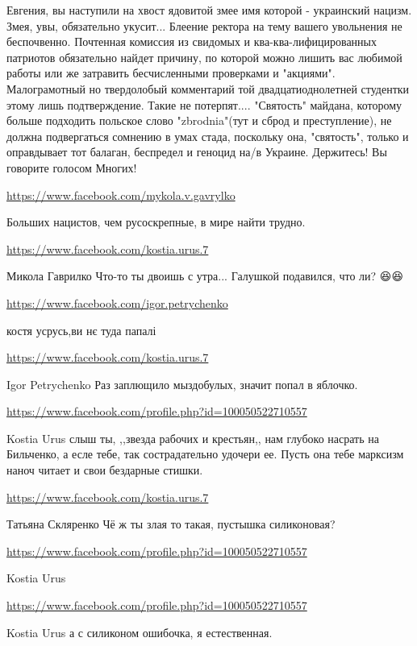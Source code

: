 \documentclass[a4paper,11pt]{extreport}
\begin{document}
\begin{itemize}
Евгения, вы наступили на хвост ядовитой змее имя которой - украинский нацизм. Змея, увы, обязательно укусит... Блеение ректора на тему вашего увольнения не беспочвенно. Почтенная комиссия из свидомых и ква-ква-лифицированных патриотов обязательно найдет причину, по которой можно лишить вас любимой работы или же затравить бесчисленными проверками и "акциями". Малограмотный но твердолобый комментарий той двадцатиоднолетней студентки этому лишь подтверждение. Такие не потерпят.... "Святость" майдана, которому больше подходить польское слово "zbrodnia"(тут и сброд и преступление), не должна подвергаться сомнению в умах стада, поскольку она, "святость", только и оправдывает тот балаган, беспредел и геноцид на/в Украине.
Держитесь! Вы говорите голосом Многих!

\begin{itemize}
\url{https://www.facebook.com/mykola.v.gavrylko}

Больших нацистов, чем русоскрепные, в мире найти трудно.

\url{https://www.facebook.com/kostia.urus.7}

Микола Гаврилко
Что-то ты двоишь с утра... Галушкой подавился, что ли? 😆😆

\url{https://www.facebook.com/igor.petrychenko}

костя усрусь,ви нє туда папалі

\url{https://www.facebook.com/kostia.urus.7}

Igor Petrychenko
Раз заплющило мыздобулых, значит попал в яблочко.

\url{https://www.facebook.com/profile.php?id=100050522710557}

Kostia Urus слыш ты, ,,звезда рабочих и крестьян,, нам глубоко насрать на Бильченко, а есле тебе, так сострадательно удочери ее. Пусть она тебе марксизм наноч читает и свои бездарные стишки.

\url{https://www.facebook.com/kostia.urus.7}

Татьяна Скляренко
Чё ж ты злая то такая,
пустышка силиконовая?

\url{https://www.facebook.com/profile.php?id=100050522710557}

Kostia Urus

\url{https://www.facebook.com/profile.php?id=100050522710557}

Kostia Urus а с силиконом ошибочка, я естественная.


\end{itemize}
\end{itemize}
\end{document}
